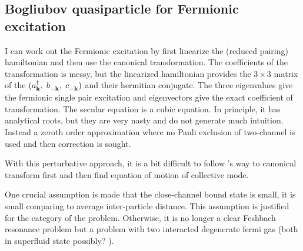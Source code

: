 \subsection{Bogliubov quasiparticle for Fermionic excitation}
I can work out the Fermionic excitation by first linearize the (reduced pairing) hamiltonian and then use the canonical transformation\cite{Tinkham}.  The coefficients of the transformation is messy, but the linearized hamiltonian provides the $3\times3$ matrix of the $(a^{\dagger}_{\mathbf{k}},\; b^{}_{-\mathbf{k}},\;c^{}_{-\mathbf{k}})$  and their hermitian conjugate.  The three eigenvalues give the fermionic single pair excitation and eigenvectors give the exact coefficient of transformation.  The secular equation is a cubic equation.  In principle, it has analytical roots, but they are very nasty and do not generate much intuition.  Instead a zeroth order approximation where no Pauli exclusion of two-channel is used and then correction is sought.  

With this perturbative approach, it is a bit difficult to follow \cite{Rickayzen}'s way to canonical transform first and then find equation of motion of collective mode.  

One crucial assumption is made that the close-channel bound state is small, it is small comparing to average inter-particle distance.  This assumption is justified for the category of the problem.  Otherwise, it is no longer a clear Feshbach resonance problem but a problem with two interacted degenerate fermi gas (both in superfluid state possibly? ).  
